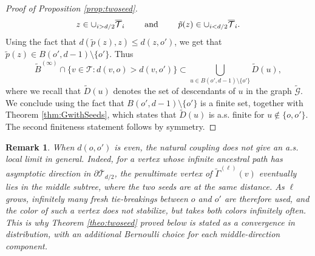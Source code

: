 \documentclass[french]{article}
\newtheorem{remark}[theorem]{Remark}
\newcommand{\T}{\mathcal{T}}
\renewcommand{\1}{\mathds{1}}
\begin{document}
\begin{proof}[Proof of Proposition \ref{prop:twoseed}]
 $$z\in \cup_{i>d/2} \overline{\T}_i \qquad \hbox{ and } \qquad \tilde{p}(z) \in  \cup_{i<d/2}\overline{\T}_i.$$
 Using the fact that $d(\tilde{p}(z),z)\le d(z,o')$, we get that $\tilde{p}(z)\in B(o',d-1)\setminus\{o'\}$.
 Thus
 $$\tilde{B}^{(\infty)} \cap \{v \in \T : d(v,o)>d(v,o')\}\subset \bigcup_{u\in B(o',d-1)\setminus\{o'\}}\tilde{D}(u),$$
 where we recall that $\tilde{D}(u)$ denotes the set of descendants of $u$ in the graph $\tilde{\mathcal{G}}$. We conclude using the fact that $B(o',d-1)\setminus\{o'\}$ is a finite set, together with Theorem \ref{thm:GwithSeeds}, which states that $\tilde{D}(u)$ is a.s. finite for $u\notin \{o,o'\}$. The second finiteness statement follows by symmetry.
\end{proof}
\medskip


\begin{remark}
When $d(o,o')$ is even, the natural coupling does not give an a.s. local limit in general. Indeed, for a vertex whose infinite ancestral path has asymptotic direction in $\partial\overline{\T}_{d/2}$, the penultimate vertex of $\tilde{\Gamma}^{(\ell)}(v)$ eventually lies in the middle subtree, where the two seeds are at the same distance. As $\ell$ grows, infinitely many fresh tie-breakings between $o$ and $o'$ are therefore used, and the color of such a vertex does not stabilize, but takes both colors infinitely often. This is why Theorem \ref{theo:twoseed} proved below is stated as a convergence in distribution, with an additional Bernoulli choice for each middle-direction component.
\end{remark}
\medskip
\end{document}
